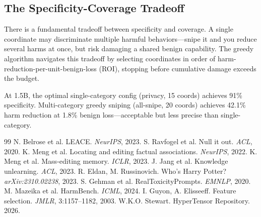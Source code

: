 \documentclass[11pt,a4paper]{article}
\begin{document}
\subsection{The Specificity-Coverage Tradeoff}

There is a fundamental tradeoff between specificity and coverage. A single coordinate may discriminate multiple harmful behaviors---snipe it and you reduce several harms at once, but risk damaging a shared benign capability. The greedy algorithm navigates this tradeoff by selecting coordinates in order of harm-reduction-per-unit-benign-loss (ROI), stopping before cumulative damage exceeds the budget.

At 1.5B, the optimal single-category config (privacy, 15 coords) achieves 91\% specificity. Multi-category greedy sniping (all-snipe, 20 coords) achieves 42.1\% harm reduction at 1.8\% benign loss---acceptable but less precise than single-category.

\begin{thebibliography}{99}
 N. Belrose et al. LEACE. \textit{NeurIPS}, 2023.
 S. Ravfogel et al. Null it out. \textit{ACL}, 2020.
 K. Meng et al. Locating and editing factual associations. \textit{NeurIPS}, 2022.
 K. Meng et al. Mass-editing memory. \textit{ICLR}, 2023.
 J. Jang et al. Knowledge unlearning. \textit{ACL}, 2023.
 R. Eldan, M. Russinovich. Who's Harry Potter? \textit{arXiv:2310.02238}, 2023.
 S. Gehman et al. RealToxicityPrompts. \textit{EMNLP}, 2020.
 M. Mazeika et al. HarmBench. \textit{ICML}, 2024.
 I. Guyon, A. Elisseeff. Feature selection. \textit{JMLR}, 3:1157--1182, 2003.
 W.K.O. Stewart. HyperTensor Repository. 2026.
\end{thebibliography}
\end{document}
